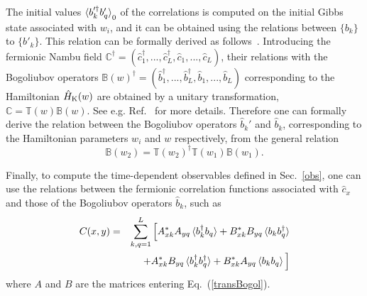 The initial values $\braket{b'^\dagger_k b'_q}_0$ of the correlations
is computed on the initial Gibbs state associated with $w_i$, and it
can be obtained using the relations between $\{b_k \}$ to $\{b'_k\}$.
This relation can be formally derived as follows~\cite{dr2021self}.
Introducing the fermionic Nambu field $\mathbb{C}^\dagger =
(\hat{c}_1^\dagger, ...,\hat{c}_L^\dagger, \hat{c}_1,...,\hat{c}_L)$,
their relations with the Bogoliubov operators $\mathbb{B}(w)^\dagger =
(\hat{b}_1^\dagger, ...,\hat{b}_L^\dagger, \hat{b}_1,...,\hat{b}_L)$
corresponding to the Hamiltonian $\hat{H}_{\rm K}(w)$ are obtained by
a unitary transformation, $\mathbb{C} = \mathbb{T}(w)\mathbb{B}(w)$.
See e.g. Ref.~\cite{dr2021self} for more details.  Therefore one can formally
derive the relation between the Bogoliubov operators $\hat{b}_k'$ and
$\hat{b}_k$, corresponding to the Hamiltonian parameters $w_i$ and $w$
respectively, from the general relation
\begin{equation}
\mathbb{B}(w_2)= \mathbb{T}(w_2)^\dagger \mathbb{T}(w_1) \mathbb{B}(w_1).
  \label{hatbrel}
  \end{equation}



Finally, to compute the time-dependent observables defined in
Sec.~\ref{obs}, one can use the relations between the fermionic
correlation functions associated with $\hat{c}_x$ and those of the
Bogoliubov operators $\hat{b}_k$, such as
  \begin{eqnarray}
   C(x,y) &=& \sum_{k,q=1}^L \Big[
  A^*_{xk}A_{yq} \braket{b^\dagger_k b_q}
  + B^*_{xk} B_{yq} \braket{b_k b^\dagger_q} \nonumber \\
  &&+ A^*_{xk} B_{yq} \braket{b^\dagger_k b^\dagger_q} +
  B^*_{xk} A_{yq} \braket{b_k b_q}\Big]
    \label{initcorr}
\end{eqnarray}
where $A$ and $B$ are the matrices entering Eq.~(\ref{transBogol}).



